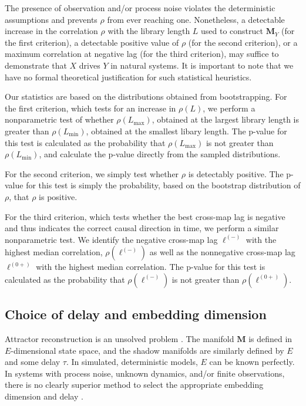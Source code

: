 \documentclass[10pt]{article}
\begin{document}
The presence of observation and/or process noise violates the deterministic assumptions and prevents $\rho$ from ever reaching one.
Nonetheless, a detectable increase in the correlation $\rho$ with the library length $L$ used to construct $\pmb{M}_Y$ (for the first criterion), a detectable positive value of $\rho$ (for the second criterion), or a maximum correlation at negative lag (for the third criterion), may suffice to demonstrate that $X$ drives $Y$ in natural systems.
It is important to note that we have no formal theoretical justification for such statistical heuristics.

Our statistics are based on the distributions obtained from bootstrapping.
For the first criterion, which tests for an increase in $\rho(L)$, we perform a nonparametric test of whether $\rho(L_{\max})$, obtained at the largest library length is greater than $\rho(L_{\min})$, obtained at the smallest libary length.
The p-value for this test is calculated as the probability that $\rho(L_{\max})$ is not greater than $\rho(L_{\min})$, and calculate the p-value directly from the sampled distributions.

For the second criterion, we simply test whether $\rho$ is detectably positive. The p-value for this test is simply the probability, based on the bootstrap distribution of $\rho$, that $\rho$ is positive.

For the third criterion, which tests whether the best cross-map lag is negative and thus indicates the correct causal direction in time, we perform a similar nonparametric test.
We identify the negative cross-map lag $\ell^{(-)}$ with the highest median correlation, $\rho(\ell^{(-)})$ as well as the nonnegative cross-map lag $\ell^{(0+)}$ with the highest median correlation.
The p-value for this test is calculated as the probability that $\rho(\ell^{(-)})$ is not greater than $\rho(\ell^{(0+)})$.

\subsection{Choice of delay and embedding dimension}
Attractor reconstruction is an unsolved problem \cite{Casdagli1991}.
The manifold $\pmb{M}$ is defined in $E$-dimensional state space, and the shadow manifolds are similarly defined by $E$ and some delay $\tau$.
In simulated, deterministic models, $E$ can be known perfectly.
In systems with process noise, unknown dynamics, and/or finite observations, there is no clearly superior method to select the appropriate embedding dimension and delay \cite{Casdagli1991,Nichkawde2013,Uzal2011,Pecora2007, Cao1997, Small2004}.
\end{document}
